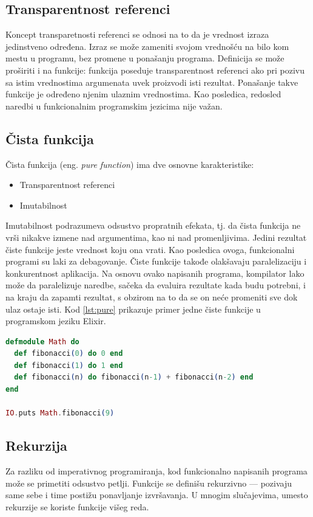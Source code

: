 \documentclass[12pt,oneside]{memoir}
\begin{document}
\subsection{Transparentnost referenci}
Koncept transparetnosti referenci se odnosi na to da je vrednost izraza jedinstveno određena. Izraz se može zameniti svojom vrednošću na bilo kom mestu u programu, bez promene u ponašanju programa. Definicija se može proširiti i na funkcije: funkcija poseduje transparentnost referenci ako pri pozivu sa istim vrednostima argumenata uvek proizvodi isti rezultat. Ponašanje takve funkcije je određeno njenim ulaznim vrednostima. Kao posledica, redosled naredbi u funkcionalnim programskim jezicima nije važan.

\subsection{Čista funkcija}
Čista funkcija (eng. \textit{pure function}) ima dve osnovne karakteristike: 
\begin{itemize}
\item Transparentnost referenci 
\item Imutabilnost 
\end{itemize}
\par Imutabilnost podrazumeva odsustvo propratnih efekata, tj. da čista funkcija ne vrši nikakve izmene nad argumentima, kao ni nad promenljivima. Jedini rezultat čiste funkcije jeste vrednost koju ona vrati. Kao posledica ovoga, funkcionalni programi su laki za debagovanje. Čiste funkcije takođe olakšavaju paralelizaciju i konkurentnost aplikacija. Na osnovu ovako napisanih programa, kompilator lako može da paralelizuje naredbe, sačeka da evaluira rezultate kada budu potrebni, i na kraju da zapamti rezultat, s obzirom na to da se on neće promeniti sve dok ulaz ostaje isti. Kod \ref{lst:pure} prikazuje primer jedne čiste funkcije u programskom jeziku Elixir. 

\begin{lstlisting}[language=elixir, caption={Primer čiste funkcije},captionpos=b, label={lst:pure}]
defmodule Math do 
  def fibonacci(0) do 0 end
  def fibonacci(1) do 1 end
  def fibonacci(n) do fibonacci(n-1) + fibonacci(n-2) end
end

IO.puts Math.fibonacci(9)
\end{lstlisting}

\subsection{Rekurzija}
Za razliku od imperativnog programiranja, kod funkcionalno napisanih programa može se primetiti odsustvo petlji. Funkcije se definišu rekurzivno --- pozivaju same sebe i time postižu ponavljanje izvršavanja. U mnogim slučajevima, umesto rekurzije se koriste funkcije višeg reda.
\end{document}
